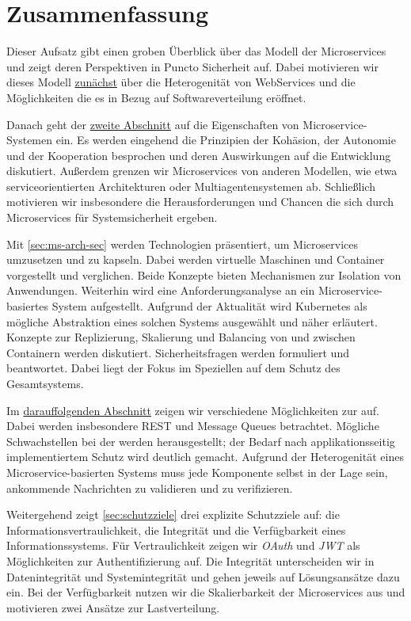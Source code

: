 \section{Zusammenfassung}
\label{sec:zsmfassung}

Dieser Aufsatz gibt einen groben Überblick über das Modell der Microservices und zeigt deren Perspektiven in Puncto Sicherheit auf. Dabei motivieren wir dieses Modell \hyperref[sec:einleitung]{zunächst} über die Heterogenität von WebServices und die Möglichkeiten die es in Bezug auf Softwareverteilung eröffnet.

Danach geht der \hyperref[sec:einführung]{zweite Abschnitt} auf die Eigenschaften von Microservice-Systemen ein. Es werden eingehend die Prinzipien der Kohäsion, der Autonomie und der Kooperation besprochen und deren Auswirkungen auf die Entwicklung diskutiert. Außerdem grenzen wir Microservices von anderen Modellen, wie etwa serviceorientierten Architekturen oder Multiagentensystemen ab. Schließlich motivieren wir insbesondere die Herausforderungen und Chancen die sich durch Microservices für Systemsicherheit ergeben.

Mit \autoref{sec:ms-arch-sec} werden Technologien präsentiert, um Microservices umzusetzen und zu kapseln. Dabei werden virtuelle Maschinen und Container vorgestellt und verglichen. Beide Konzepte bieten Mechanismen zur Isolation von Anwendungen. Weiterhin wird eine Anforderungsanalyse an ein Microservice-basiertes System aufgestellt. Aufgrund der Aktualität wird Kubernetes als mögliche Abstraktion eines solchen Systems ausgewählt und näher erläutert. Konzepte zur Replizierung, Skalierung und Balancing von und zwischen Containern werden diskutiert. Sicherheitsfragen werden formuliert und beantwortet. Dabei liegt der Fokus im Speziellen auf dem Schutz des Gesamtsystems.

Im \hyperref[sec:kommunikation]{darauffolgenden Abschnitt} zeigen wir verschiedene Möglichkeiten zur \stscom auf. Dabei werden insbesondere REST und Message Queues betrachtet. Mögliche Schwachstellen bei der \stscom werden herausgestellt; der Bedarf nach applikationsseitig implementiertem Schutz wird deutlich gemacht. Aufgrund der Heterogenität eines Microservice-basierten Systems muss jede Komponente selbst in der Lage sein, ankommende Nachrichten zu validieren und zu verifizieren.

Weitergehend zeigt \autoref{sec:schutzziele} drei explizite Schutzziele auf: die Informationsvertraulichkeit, die Integrität und die Verfügbarkeit eines Informationssystems. Für Vertraulichkeit zeigen wir \textit{OAuth} und \textit{JWT} als Möglichkeiten zur Authentifizierung auf. Die Integrität unterscheiden wir in Datenintegrität und Systemintegrität und gehen jeweils auf Lösungsansätze dazu ein. Bei der Verfügbarkeit nutzen wir die Skalierbarkeit der Microservices aus und motivieren zwei Ansätze zur Lastverteilung.